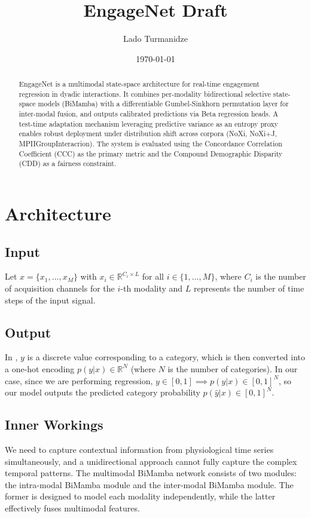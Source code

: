 \documentclass[11pt,a4paper]{article}
\newcommand{\R}{\mathbb{R}}
\begin{document}
	
	\title{\textbf{EngageNet Draft}}
	\author{Lado Turmanidze}
	\date{\today}
	\maketitle
	
	\begin{abstract}
		EngageNet is a multimodal state-space architecture for real-time engagement regression in dyadic interactions. It combines per-modality bidirectional selective state-space models (BiMamba) with a differentiable Gumbel-Sinkhorn permutation layer for inter-modal fusion, and outputs calibrated predictions via Beta regression heads. A test-time adaptation mechanism leveraging predictive variance as an entropy proxy enables robust deployment under distribution shift across corpora (NoXi, NoXi+J, MPIIGroupInteracrion). The system is evaluated using the Concordance Correlation Coefficient (CCC) as the primary metric and the Compound Demographic Disparity (CDD) as a fairness constraint.
	\end{abstract}

	\section{Architecture}
	\subsection{Input}
	Let $x=\{x_{1},\dots,x_{M}\}$ with $x_{i}\in\R^{C_{i}\times L}$ for all $i\in\{1,\dots,M\}$, where $C_{i}$ is the number of acquisition channels for the $i$-th modality and $L$ represents the number of time steps of the input signal.
	
	\subsection{Output}
	In \cite{ziyu2025}, $y$ is a discrete value corresponding to a category, which is then converted into a one-hot encoding $p(y|x)\in\R^{N}$ (where $N$ is the number of categories). In our case, since we are performing regression, $y\in[0,1] \implies p(y|x)\in[0,1]^{N}$, so our model outputs the predicted category probability $p(\hat{y}|x)\in[0,1]^{N}$.
	
	\subsection{Inner Workings}
	We need to capture contextual information from physiological time series simultaneously, and a unidirectional approach cannot fully capture the complex temporal patterns. The multimodal BiMamba network consists of two modules: the intra-modal BiMamba module and the inter-modal BiMamba module. The former is designed to model each modality independently, while the latter effectively fuses multimodal features.
	
\end{document}
